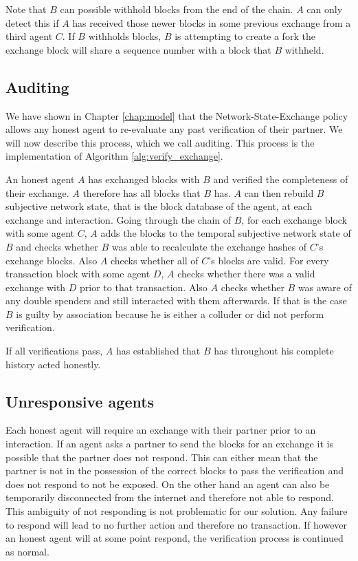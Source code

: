 Note that $B$ can possible withhold blocks from the end of the chain. $A$ can only detect this if 
$A$ has received those newer blocks in some previous exchange from a third agent $C$. If $B$ withholds
blocks, $B$ is attempting to create a fork the exchange block will share a sequence number with a
block that $B$ withheld.

\subsection{Auditing}
We have shown in Chapter \ref{chap:model} that the Network-State-Exchange policy allows any honest
agent to re-evaluate any past verification of their partner. We will now describe this process, which
we call auditing. This process is the implementation of Algorithm \ref{alg:verify_exchange}.

An honest agent $A$ has exchanged blocks with $B$ and verified the completeness of their exchange.
$A$ therefore has all blocks that $B$ has. $A$ can then rebuild $B$ subjective network state, that
is the block database of the agent, at each exchange and interaction. Going through the chain of $B$, 
for each exchange block with some agent $C$, $A$ adds the blocks to the temporal subjective network
state of $B$ and checks whether $B$ was able to recalculate the exchange hashes of $C$'s exchange
blocks. Also $A$ checks whether all of $C$'s blocks are valid. For every transaction block with some
agent $D$, $A$ checks whether there was a valid exchange with $D$ prior to that transaction. Also 
$A$ checks whether $B$ was aware of any double spenders and still interacted with them afterwards. 
If that is the case $B$ is guilty by association because he is either a colluder or did not perform
verification.

If all verifications pass, $A$ has established that $B$ has throughout his complete history acted 
honestly. 

\subsection{Unresponsive agents}
Each honest agent will require an exchange with their partner prior to an interaction. If an agent 
asks a partner to send the blocks for an exchange it is possible that the partner does not respond.
This can either mean that the partner is not in the possession of the correct blocks to pass the  
verification and does not respond to not be exposed. On the other hand an agent can also be 
temporarily disconnected from the internet and therefore not able to respond. This ambiguity of not 
responding is not problematic for our solution. Any failure to respond will
lead to no further action and therefore no transaction. If however an honest agent will at some 
point respond, the verification process is continued as normal.

